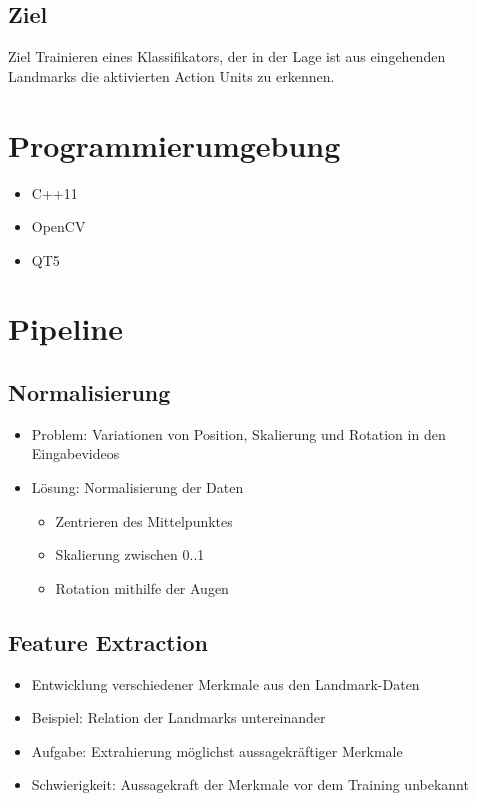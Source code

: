 \documentclass{beamer}
\begin{document}
\subsection{Ziel}
\begin{frame}
  \begin{block}{Ziel}
    Trainieren eines Klassifikators, der in der Lage ist aus eingehenden Landmarks die aktivierten Action Units zu erkennen.
  \end{block}
\end{frame}

\section{Programmierumgebung}
\begin{frame}
  \begin{itemize}
    \item C++11
    \item OpenCV
    \item QT5
  \end{itemize}
\end{frame}

\section{Pipeline}
\subsection{Normalisierung}
\begin{frame}
  \begin{itemize}
    \item Problem: Variationen von Position, Skalierung und
      Rotation in den Eingabevideos
    \item Lösung: Normalisierung der Daten
    \begin{itemize}
      \item Zentrieren des Mittelpunktes
      \item Skalierung zwischen 0..1
      \item Rotation mithilfe der Augen
    \end{itemize}
  \end{itemize}
\end{frame}

\subsection{Feature Extraction}
\begin{frame}
  \begin{itemize}
    \item Entwicklung verschiedener Merkmale aus den Landmark-Daten
    \item Beispiel: Relation der Landmarks untereinander
    \item Aufgabe: Extrahierung möglichst aussagekräftiger Merkmale
    \item Schwierigkeit: Aussagekraft der Merkmale vor dem Training unbekannt
  \end{itemize}
\end{frame}
\end{document}
